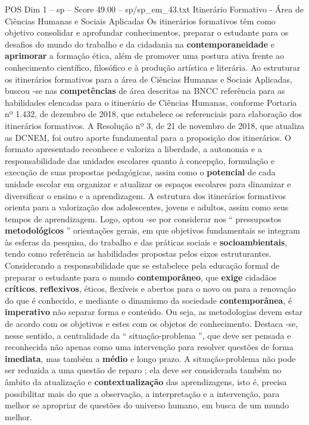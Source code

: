 \begin{textsample}{POS Dim 1 – sp – Score 49.00 – sp/sp\_em\_43.txt}  \label{ex:f1_pos_111}
Itinerário Formativo - Área de Ciências Humanas e Sociais Aplicadas Os itinerários formativos têm como objetivo consolidar e aprofundar conhecimentos, preparar o estudante para os desafios do mundo do trabalho e da cidadania na \textbf{contemporaneidade} e \textbf{aprimorar} a formação ética, além de promover uma postura ativa frente ao conhecimento científico, filosófico e à produção artística e literária.
Ao estruturar os itinerários formativos para a área de Ciências Humanas e Sociais Aplicadas, buscou -se nas \textbf{competências} de área descritas na BNCC referência para as habilidades elencadas para o itinerário de Ciências Humanas, conforme Portaria nº 1.432, de dezembro de 2018, que estabelece os referenciais para elaboração dos itinerários formativos.
A Resolução nº 3, de 21 de novembro de 2018, que atualiza as DCNEM, foi outro aporte fundamental para a proposição dos itinerários.
O formato apresentado reconhece e valoriza a liberdade, a autonomia e a responsabilidade das unidades escolares quanto à concepção, formulação e execução de suas propostas pedagógicas, assim como o \textbf{potencial} de cada unidade escolar em organizar e atualizar os espaços escolares para dinamizar e diversificar o ensino e a aprendizagem.
A estrutura dos itinerários formativos orienta para a valorização dos adolescentes, jovens e adultos, assim como seus tempos de aprendizagem.
Logo, optou -se por considerar nos “ pressupostos \textbf{metodológicos} ” orientações gerais, em que objetivos fundamentais se integram às esferas da pesquisa, do trabalho e das práticas sociais e \textbf{socioambientais}, tendo como referência as habilidades propostas pelos eixos estruturantes.
Considerando a responsabilidade que se estabelece pela educação formal de preparar o estudante para o mundo \textbf{contemporâneo}, que \textbf{exige} cidadãos \textbf{críticos}, \textbf{reflexivos}, éticos, flexíveis e abertos para o novo ou para a renovação do que é conhecido, e mediante o dinamismo da sociedade \textbf{contemporânea}, é \textbf{imperativo} não separar forma e conteúdo.
Ou seja, as metodologias devem estar de acordo com os objetivos e estes com os objetos de conhecimento.
Destaca -se, nesse sentido, a centralidade da “ situação-problema ”, que deve ser pensada e reconhecida não apenas como uma intervenção para resolver questões de forma \textbf{imediata}, mas também a \textbf{médio} e longo prazo.
A situação-problema não pode ser reduzida a uma questão de reparo ; ela deve ser considerada também no âmbito da atualização e \textbf{contextualização} das aprendizagens, isto é, precisa possibilitar mais do que a observação, a interpretação e a intervenção, para melhor se apropriar de questões do universo humano, em busca de um mundo melhor.

\end{textsample}
